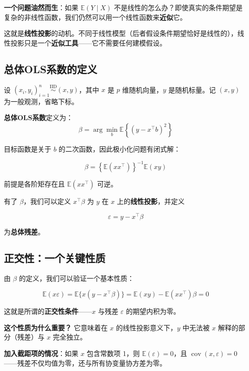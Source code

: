 \textbf{一个问题油然而生}：如果 $\mathbb{E}(Y \mid X)$ 不是线性的怎么办？即使真实的条件期望是复杂的非线性函数，我们仍然可以用一个线性函数来\textbf{近似}它。

这就是\textbf{线性投影}的动机。不同于线性模型（后者假设条件期望恰好是线性的），线性投影只是一个\textbf{近似工具}——它不需要任何建模假设。

\subsection{总体OLS系数的定义}\label{sec:B-population-ols-def}

设 $(x_i, y_i)_{i=1}^n \stackrel{\mathrm{IID}}{\sim} (x, y)$，其中 $x$ 是 $p$ 维随机向量，$y$ 是随机标量。记 $(x, y)$ 为一般观测，省略下标。

\textbf{总体OLS系数}定义为：
\[
\beta = \arg\min_{b} \mathbb{E}\left\{(y - x^\top b)^2\right\}
\tag{B.1}
\]

目标函数是关于 $b$ 的二次函数，因此极小化问题有闭式解：

\[
\beta = \left\{\mathbb{E}(x x^\top)\right\}^{-1} \mathbb{E}(x y)
\tag{B.2}
\]

前提是各阶矩存在且 $\mathbb{E}(x x^\top)$ 可逆。

有了 $\beta$，我们可以定义 $x^\top \beta$ 为 $y$ 在 $x$ 上的\textbf{线性投影}，并定义

\[
\varepsilon = y - x^\top \beta
\tag{B.3}
\]

为\textbf{总体残差}。

\subsection{正交性：一个关键性质}\label{sec:B-orthogonality}

由 $\beta$ 的定义，我们可以验证一个基本性质：

\[
\mathbb{E}(x \varepsilon) = \mathbb{E}\{x(y - x^\top \beta)\} = \mathbb{E}(xy) - \mathbb{E}(x x^\top)\beta = 0
\tag{B.4}
\]

这就是所谓的\textbf{正交性条件}——$x$ 与残差 $\varepsilon$ 的期望内积为零。

\textbf{这个性质为什么重要？} 它意味着在 $x$ 的线性投影意义下，$y$ 中无法被 $x$ 解释的部分（残差）与 $x$ 完全独立。

\textbf{加入截距项的情况}：如果 $x$ 包含常数项 1，则 $\mathbb{E}(\varepsilon) = 0$，且 $\operatorname{cov}(x, \varepsilon) = 0$——残差不仅均值为零，还与所有协变量协方差为零。


